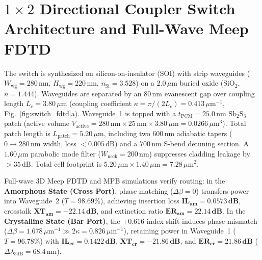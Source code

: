 \documentclass[letterpaper,10pt]{article}
\begin{document}
\section{\texorpdfstring{$1\times 2$}{1x2} Directional Coupler Switch Architecture and Full-Wave Meep FDTD}
The switch is synthesized on silicon-on-insulator (SOI) with strip waveguides ($W_{\text{wg}} = 280\,\text{nm}$, $H_{\text{wg}} = 220\,\text{nm}$, $n_{\text{Si}} = 3.528$) on a $2.0\,\mu\text{m}$ buried oxide ($\text{SiO}_2$, $n = 1.444$). Waveguides are separated by an $80\,\text{nm}$ evanescent gap over coupling length $L_c = 3.80\,\mu\text{m}$ (coupling coefficient $\kappa = \pi / (2 L_c) = 0.413\,\mu\text{m}^{-1}$, Fig.~\ref{fig:switch_fdtd}a). Waveguide~1 is topped with a $t_{\text{PCM}} = 25.0\,\text{nm}$ $\text{Sb}_2\text{S}_3$ patch (active volume $V_{\text{active}} = 280\,\text{nm} \times 25\,\text{nm} \times 3.80\,\mu\text{m} = 0.0266\,\mu\text{m}^3$). Total patch length is $L_{\text{patch}} = 5.20\,\mu\text{m}$, including two $600\,\text{nm}$ adiabatic tapers ($0 \to 280\,\text{nm}$ width, loss $< 0.005\,\text{dB}$) and a $700\,\text{nm}$ S-bend detuning section. A $1.60\,\mu\text{m}$ parabolic mode filter ($W_{\text{neck}} = 200\,\text{nm}$) suppresses cladding leakage by $>35\,\text{dB}$. Total cell footprint is $5.20\,\mu\text{m} \times 1.40\,\mu\text{m} = 7.28\,\mu\text{m}^2$.

Full-wave 3D Meep FDTD \cite{OsgoodMeep2010} and MPB \cite{MPB2001} simulations verify routing: in the \textbf{Amorphous State (Cross Port)}, phase matching ($\Delta\beta = 0$) transfers power into Waveguide~2 ($T = 98.69\%$), achieving insertion loss $\mathbf{\text{IL}_{\text{am}} = 0.0573\,\text{dB}}$, crosstalk $\mathbf{\text{XT}_{\text{am}} = -22.14\,\text{dB}}$, and extinction ratio $\mathbf{\text{ER}_{\text{am}} = 22.14\,\text{dB}}$. In the \textbf{Crystalline State (Bar Port)}, the $+0.616$ index shift induces phase mismatch ($\Delta\beta = 1.678\,\mu\text{m}^{-1} \gg 2\kappa = 0.826\,\mu\text{m}^{-1}$), retaining power in Waveguide~1 ($T = 96.78\%$) with $\mathbf{\text{IL}_{\text{cr}} = 0.1422\,\text{dB}}$, $\mathbf{\text{XT}_{\text{cr}} = -21.86\,\text{dB}}$, and $\mathbf{\text{ER}_{\text{cr}} = 21.86\,\text{dB}}$ ($\Delta\lambda_{\text{3dB}} = 68.4\,\text{nm}$).
\end{document}
